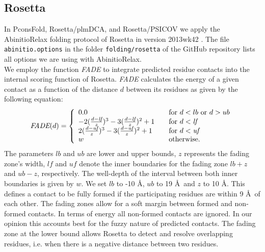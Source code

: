 \documentclass{bioinfo}
\begin{document}
\begin{methods}
\subsection{Rosetta}
In PconsFold, Rosetta/plmDCA, and Rosetta/PSICOV we apply the AbinitioRelax folding protocol \cite[]{rohl_protein_2004} of Rosetta in version 2013wk42 \cite[]{leaver-fay_rosetta3:_2011}. The file {\tt abinitio.options} in the folder {\tt folding/rosetta} of the GitHub repository lists all options we are using with AbinitioRelax. \\\indent 
We employ the function \emph{FADE} to integrate predicted residue contacts into the internal scoring function of Rosetta. \emph{FADE} calculates the energy of a given contact as a function of the distance $d$ between its residues as given by the following equation:
\begin{equation}%
    \textit{FADE}(d) = \left\{
    \begin{array}{l l l}\label{eq:fade}
        0.0 & \quad \textrm{for $d < lb$ or $d > ub$} \\
        -2(\frac{d - \textit{lf}}{z})^3 - 3(\frac{d - \textit{lf}}{z})^2 + 1 & \quad \textrm{for $d < \textit{lf}$} \\
        2(\frac{d - \textit{uf}}{z})^3 - 3(\frac{d - \textit{uf}}{z})^2 + 1 & \quad \textrm{for $d < \textit{uf}$} \\
        w & \quad \textrm{otherwise.} \\
    \end{array} \right.
\end{equation}
The parameters $lb$ and $ub$ are lower and upper bounds, $z$ represents the fading zone's width, $\textit{lf}$ and $\textit{uf}$ denote the inner boundaries for the fading zone $lb + z$ and $ub - z$, respectively. The well-depth of the interval between both inner boundaries is given by $w$. We set $lb$ to -10 \AA, $ub$ to 19 \AA\ and $z$ to 10 \AA. This defines a contact to be fully formed if the participating residues are within 9 \AA\ of each other. The fading zones allow for a soft margin between formed and non-formed contacts. In terms of energy all non-formed contacts are ignored. In our opinion this accounts best for the fuzzy nature of predicted contacts. The fading zone at the lower bound allows Rosetta to detect and resolve overlapping residues, i.e. when there is a negative distance between two residues.\\\indent


\end{methods}
\end{document}
